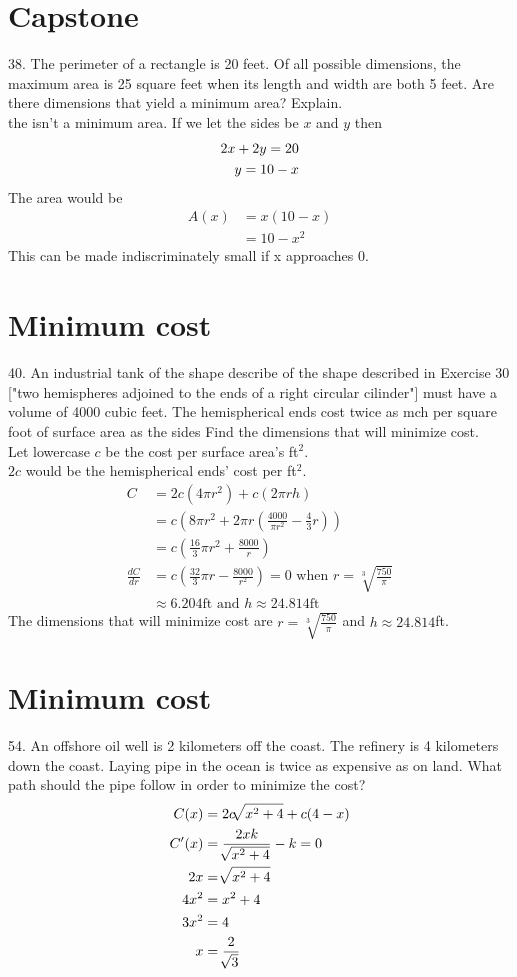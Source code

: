 \documentclass[11pt]{article}
\newcommand*{\set}{\setcounter{equation}{0}}
\begin{document}
\section{Capstone}
38. The perimeter of a rectangle is 20 feet. Of all possible dimensions, the maximum area is 25 square feet when its length and width are both 5 feet. Are there dimensions that yield a minimum area? Explain.\\
\indent the isn't a minimum area. If we let the sides be $x$ and $y$ then
\begin{align}
    \set
    2x+2y=20\\
    y=10-x
\end{align}
The area would be 
\begin{align}
    A(x)&=x(10-x)\\
    &=10-x^2
\end{align}
This can be made indiscriminately small if x approaches 0.

\section{Minimum cost}
40. An industrial tank of the shape describe of the shape described in Exercise 30 ["two hemispheres adjoined to the ends of a right circular cilinder"] must have a volume of 4000 cubic feet. The hemispherical ends cost twice as mch per square foot of surface area as the sides Find the dimensions that will minimize cost.\\
\indent Let lowercase $c$ be the cost per surface area's ft$^2$.\\
$2c$ would be the hemispherical ends' cost per ft$^2$.
\begin{align}
    C&=2c(4\pi r^2)+c(2\pi rh)\\
    &=c(8\pi r^2+2\pi r\left(\frac{4000}{\pi r^2}-\frac{4}{3}r\right))\\
    &=c\left(\frac{16}{3}\pi r^2+\frac{8000}{r}\right)\\
    \frac{dC}{dr}&=c\left(\frac{32}{3}\pi r-\frac{8000}{r^2}\right)=0\,\,\text{when}\,\, r=\sqrt[3]{\frac{750}{\pi}}\\
    &\approx 6.204\text{ft}\,\,\text{and}\,\, h\approx 24.814\text{ft}
\end{align}
The dimensions that will minimize cost are $r=\sqrt[3]{\frac{750}{\pi}}$ and $h\approx 24.814$ft.

\section{Minimum cost}
54. An offshore oil well is 2 kilometers off the coast. The refinery is 4 kilometers down the coast. Laying pipe in the ocean is twice as expensive as on land. What path should the pipe follow in order to minimize the cost?
\begin{align}
    \set
    C(x)&=2c\sqrt[]{x^2+4}+c(4-x)\\
    C'(x)&=\frac{2xk}{\sqrt[]{x^2+4}}-k=0\\
    2x&=\sqrt[]{x^2+4}\\
    4x^2&=x^2+4\\
    3x^2&=4\\
    x&=\frac{2}{\sqrt[]{3}}
\end{align}
\end{document}
